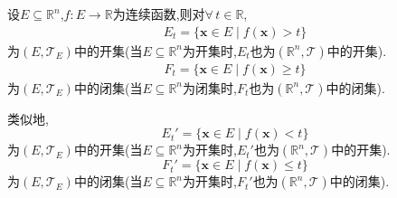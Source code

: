 \documentclass[../../main.tex]{subfiles}%
\begin{document}
\begin{proposition}\label{proposition:连续函数的基本性质命题}
设$E\subseteq\mathbb{R}^n$,$f:E\to\mathbb{R}$为连续函数,则对$\forall\,t\in\mathbb{R}$,
\begin{align*}
E_t=\{\boldsymbol{x}\in E\mid f(\boldsymbol{x})>t\}
\end{align*}
为$(E,\mathscr{T}_E)$中的开集(当$E\subseteq\mathbb{R}^n$为开集时,$E_t$也为$(\mathbb{R}^n,\mathscr{T})$中的开集).
\begin{align*}
F_t=\{\boldsymbol{x}\in E\mid f(\boldsymbol{x})\geqslant t\}
\end{align*}
为$(E,\mathscr{T}_E)$中的闭集(当$E\subseteq\mathbb{R}^n$为闭集时,$F_t$也为$(\mathbb{R}^n,\mathscr{T})$中的闭集).

类似地,$$E_t'=\{\boldsymbol{x}\in E\mid f(\boldsymbol{x})<t\}$$
为$(E,\mathscr{T}_E)$中的开集(当$E\subseteq\mathbb{R}^n$为开集时,$E_t'$也为$(\mathbb{R}^n,\mathscr{T})$中的开集).
$$F_t'=\{\boldsymbol{x}\in E\mid f(\boldsymbol{x})\leqslant t\}$$
为$(E,\mathscr{T}_E)$中的闭集(当$E\subseteq\mathbb{R}^n$为开集时,$F_t'$也为$(\mathbb{R}^n,\mathscr{T})$中的闭集).
\end{proposition}
\end{document}
